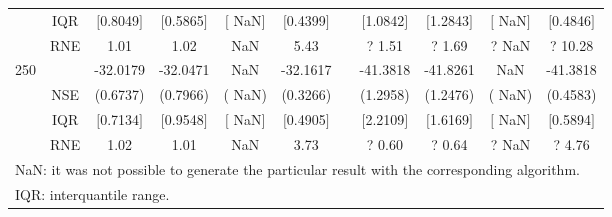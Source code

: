 {{\begin{longtable}{ccccccccccc}
 & IQR & $[$0.8049$]$ & $[$0.5865$]$ & $[$   NaN$]$ & $[$0.4399$]$ & & $[$1.0842$]$ & $[$1.2843$]$  &$[$   NaN$]$ & $[$0.4846$]$  \\  
  & RNE &   1.01 &   1.02 &    NaN &   5.43 &  &?   1.51 & ?   1.69 &  ?    NaN & ?  10.28   \\ [1ex] 
250 & & -32.0179 & -32.0471 &    NaN & -32.1617 & & -41.3818 & -41.8261 &    NaN & -41.3818  \\ 
  & NSE & (0.6737) & (0.7966) & (   NaN) & (0.3266) & & (1.2958) & (1.2476) & (   NaN) & (0.4583)   \\ 
 & IQR & $[$0.7134$]$ & $[$0.9548$]$ & $[$   NaN$]$ & $[$0.4905$]$ & & $[$2.2109$]$ & $[$1.6169$]$  &$[$   NaN$]$ & $[$0.5894$]$  \\  
  & RNE &   1.02 &   1.01 &    NaN &   3.73 &  &?   0.60 & ?   0.64 &  ?    NaN & ?   4.76   \\ [1ex] 
\hline 
  \multicolumn{11}{l}{\footnotesize{NaN: it was not possible to generate the particular result with the corresponding algorithm.}} \\ 
  \multicolumn{11}{l}{\footnotesize{IQR: interquantile range.}} \\ 
\end{longtable} 
} 
} 
